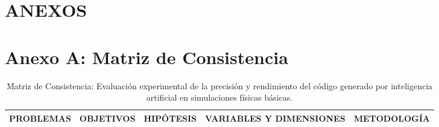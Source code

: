 \section{ANEXOS}

\section*{Anexo A: Matriz de Consistencia}

\begin{landscape}
\begin{table}[ht]
\centering
\caption{Matriz de Consistencia: Evaluación experimental de la precisión y rendimiento del código generado por inteligencia artificial en simulaciones físicas básicas.}
\label{tab:matriz_consistencia}
\scriptsize
\renewcommand{\arraystretch}{1.8}
\begin{tabularx}{\linewidth}{|X|X|X|X|X|}
\hline
\rowcolor[HTML]{EFEFEF} 
\centering \textbf{PROBLEMAS} & \centering \textbf{OBJETIVOS} & \centering \textbf{HIPÓTESIS} & \centering \textbf{VARIABLES Y DIMENSIONES} & \centering \textbf{METODOLOGÍA} \tabularnewline \hline


\end{tabularx}
\end{table}
\end{landscape}
